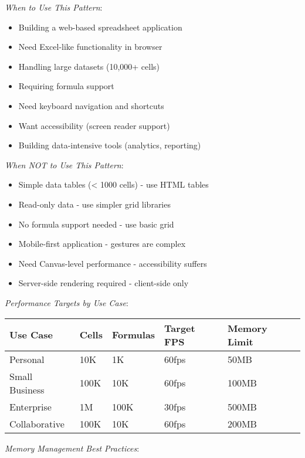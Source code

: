 \documentclass[11pt]{article}
\begin{document}
\emph{When to Use This Pattern}:

\begin{itemize}
\item Building a web-based spreadsheet application
\item Need Excel-like functionality in browser
\item Handling large datasets (10,000+ cells)
\item Requiring formula support
\item Need keyboard navigation and shortcuts
\item Want accessibility (screen reader support)
\item Building data-intensive tools (analytics, reporting)
\end{itemize}

\emph{When NOT to Use This Pattern}:

\begin{itemize}
\item Simple data tables (< 1000 cells) - use HTML tables
\item Read-only data - use simpler grid libraries
\item No formula support needed - use basic grid
\item Mobile-first application - gestures are complex
\item Need Canvas-level performance - accessibility suffers
\item Server-side rendering required - client-side only
\end{itemize}

\emph{Performance Targets by Use Case}:

\begin{center}
\begin{tabular}{lllll}
Use Case & Cells & Formulas & Target FPS & Memory Limit\\
\hline
Personal & 10K & 1K & 60fps & 50MB\\
Small Business & 100K & 10K & 60fps & 100MB\\
Enterprise & 1M & 100K & 30fps & 500MB\\
Collaborative & 100K & 10K & 60fps & 200MB\\
\end{tabular}
\end{center}

\emph{Memory Management Best Practices}:
\end{document}
